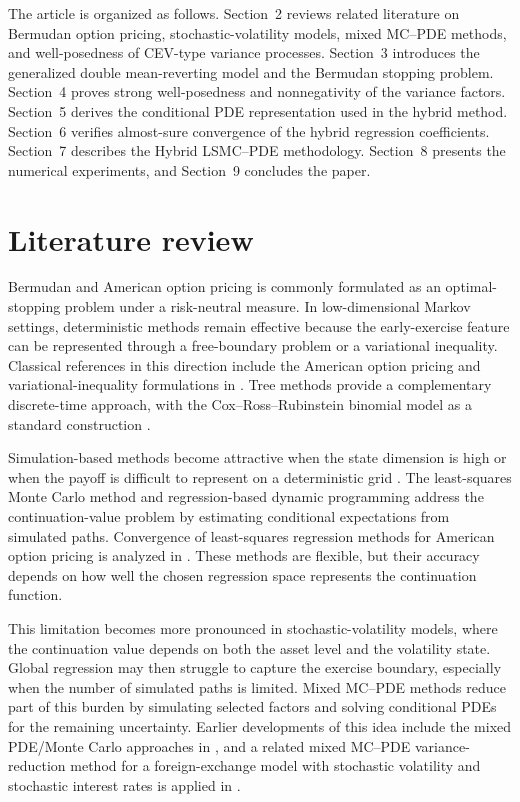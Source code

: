 \documentclass[pdflatex,sn-mathphys-num]{sn-jnl}
\theoremstyle{thmstyleone}%
\theoremstyle{thmstylethree}%
\theoremstyle{thmstyletwo}%
\begin{document}
The article is organized as follows. Section~2 reviews related literature on Bermudan option pricing, stochastic-volatility models, mixed MC--PDE methods, and well-posedness of CEV-type variance processes. Section~3 introduces the generalized double mean-reverting model and the Bermudan stopping problem. Section~4 proves strong well-posedness and nonnegativity of the variance factors. Section~5 derives the conditional PDE representation used in the hybrid method. Section~6 verifies almost-sure convergence of the hybrid regression coefficients. Section~7 describes the Hybrid LSMC--PDE methodology. Section~8 presents the numerical experiments, and Section~9 concludes the paper.







\section{Literature review}

Bermudan and American option pricing is commonly formulated as an optimal-stopping problem under a risk-neutral measure. In low-dimensional Markov settings, deterministic methods remain effective because the early-exercise feature can be represented through a free-boundary problem or a variational inequality. Classical references in this direction include the American option pricing and variational-inequality formulations in \cite{merton1977americanput,jaillet1990variational}. Tree methods provide a complementary discrete-time approach, with the Cox--Ross--Rubinstein binomial model as a standard construction \cite{cox1979option}.

Simulation-based methods become attractive when the state dimension is high or when the payoff is difficult to represent on a deterministic grid \citep{glasserman2004montecarlo}. The least-squares Monte Carlo method \cite{longstaff2001valuing} and regression-based dynamic programming \cite{tsitsiklis2001regression} address the continuation-value problem by estimating conditional expectations from simulated paths. Convergence of least-squares regression methods for American option pricing is analyzed in \cite{clement2002analysis}. These methods are flexible, but their accuracy depends on how well the chosen regression space represents the continuation function.

This limitation becomes more pronounced in stochastic-volatility models, where the continuation value depends on both the asset level and the volatility state. Global regression may then struggle to capture the exercise boundary, especially when the number of simulated paths is limited. Mixed MC--PDE methods reduce part of this burden by simulating selected factors and solving conditional PDEs for the remaining uncertainty. Earlier developments of this idea include the mixed PDE/Monte Carlo approaches in \cite{loeper2009mixed,lipp2013mixing}, and a related mixed MC--PDE variance-reduction method for a foreign-exchange model with stochastic volatility and stochastic interest rates is applied in \cite{cozma2017mixed}.
\end{document}
